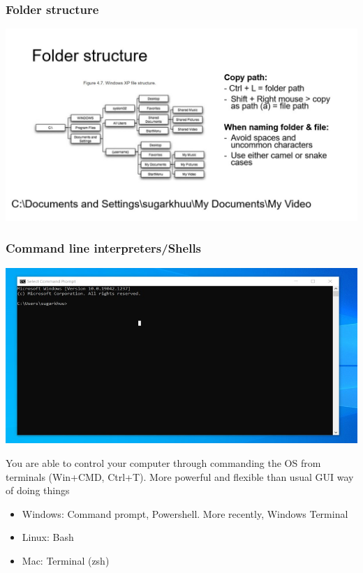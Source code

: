\documentclass{beamer}
\begin{document}
\begin{frame}
    \frametitle{Folder structure}
    \centering
    \includegraphics[scale = 0.5]{figures/folder.jpg}
\end{frame}


\begin{frame}
    \frametitle{Command line interpreters/Shells}
    \centering
    \includegraphics[scale = 0.3]{figures/bash.jpg}

    You are able to control your computer through commanding
    the OS from terminals (Win+CMD, Ctrl+T). More powerful and flexible than usual GUI way of doing things \\

    \begin{itemize}
        \item Windows: Command prompt, Powershell. More recently, Windows Terminal \\
        \item Linux: Bash
        \item Mac: Terminal (zsh)
    \end{itemize}
\end{frame}
\end{document}

